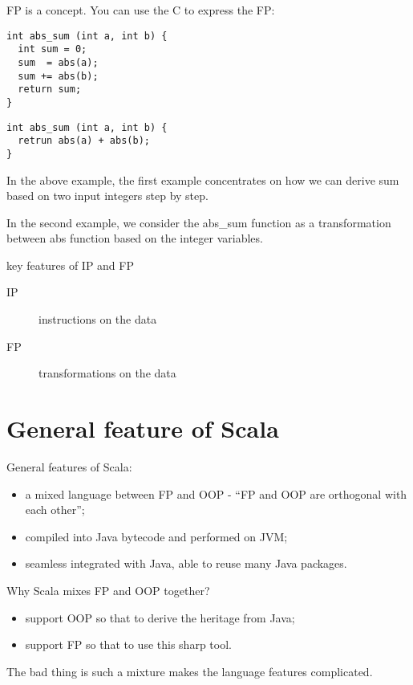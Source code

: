 \documentclass[notheorems, aspectratio=54]{beamer}
\begin{document}
\begin{frame}[fragile]

FP is a concept. You can use the C to express the FP:

\begin{verbatim}
int abs_sum (int a, int b) {
  int sum = 0;
  sum  = abs(a);
  sum += abs(b);
  return sum;
}
\end{verbatim}

\begin{verbatim}
int abs_sum (int a, int b) {
  retrun abs(a) + abs(b);
}
\end{verbatim}

In the above example, the first example concentrates on how we can derive sum based 
on two input integers step by step. 

In the second example, we consider the abs\_sum function as a transformation between 
abs function based on the integer variables. 

\begin{block}{key features of IP and FP}
 \begin{description}
 \item [IP] instructions on the data
 \item [FP] transformations on the data
\end{description}
\end{block}

\end{frame}

\section{General feature of Scala}
\begin{frame}[fragile]

General features of Scala:
\begin{itemize}
 \item a mixed language between FP and OOP - ``FP and OOP are orthogonal with each other'';
 \item compiled into Java bytecode and performed on JVM;
 \item seamless integrated with Java, able to reuse many Java packages.
\end{itemize}

Why Scala mixes FP and OOP together? 
\begin{itemize}
 \item support OOP so that to derive the heritage from Java;
 \item support FP so that to use this sharp tool.
\end{itemize}
The bad thing is such a mixture makes the language features complicated.

\end{frame}
\end{document}
